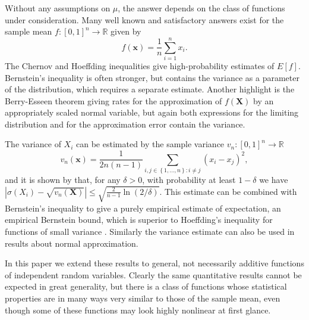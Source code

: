 \documentclass[final,12pt]{colt2018} %
\begin{document}
Without any assumptions on $\mu $, the answer depends on the class of
functions under consideration. Many well known and satisfactory answers
exist for the sample mean $f:\left[ 0,1\right] ^{n}\rightarrow 
\mathbb{R}
$ given by%
\begin{equation}
f\left( \mathbf{x}\right) =\frac{1}{n}\sum_{i=1}^{n}x_{i}.
\label{Sample mean}
\end{equation}%
The Chernov and Hoeffding inequalities \citep{McDiarmid 1998,Boucheron13} give high-probability estimates of $E\left[ f\right] $.
Bernstein's inequality is often stronger, but contains the variance as a
parameter of the distribution, which requires a separate estimate. Another
highlight is the Berry-Esseen theorem \citep{Berry 1941} giving rates for the
approximation of $f\left( \mathbf{X}\right) $ by an appropriately scaled
normal variable, but again both expressions for the limiting distribution
and for the approximation error contain the variance.

The variance of $X_{i}$ can be estimated by the sample variance $v_n:\left[ 0,1%
\right] ^{n}\rightarrow 
\mathbb{R}
$%
\begin{equation}
v_{n}\left( \mathbf{x}\right) =\frac{1}{2n\left( n-1\right) }\sum_{i,j\in
	\left\{ 1,...,n\right\} :i\neq j}\left( x_{i}-x_{j}\right) ^{2},
\label{Sample variance}
\end{equation}%
and it is shown by \citet{Maurer 2009} \citep[see also][]{Audibert}
that, for any $\delta >0$, with probability at least $1-\delta $ we have 
$\left\vert \sigma \left( X_{i}\right) -\sqrt{v_{n}\left( \mathbf{X}\right) }%
\right\vert \leq \sqrt{ \frac{2}{n-1}\ln \left( 2/\delta \right) }$.
This estimate can be combined with Bernstein's inequality to give a purely
empirical estimate of expectation, an empirical Bernstein bound, which is
superior to Hoeffding's inequality for functions of small variance \citep{Audibert,Maurer 2009}. Similarly the variance estimate can also be used in results
about normal approximation.%

In this paper we extend these results to general, not necessarily additive
functions of independent random variables. Clearly the same quantitative
results cannot be expected in great generality, but there is a class of
functions whose statistical properties are in many ways very similar to
those of the sample mean, even though some of these functions may look
highly nonlinear at first glance.%
\end{document}
